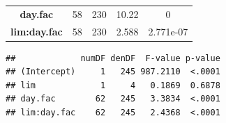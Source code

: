 \documentclass[]{article}
\begin{document}
\begin{longtable}[]{@{}ccccc@{}}
\begin{minipage}[t]{0.21\columnwidth}
\textbf{day.fac}
\strut\end{minipage} &
\begin{minipage}[t]{0.10\columnwidth}\centering\strut
58
\strut\end{minipage} &
\begin{minipage}[t]{0.10\columnwidth}\centering\strut
230
\strut\end{minipage} &
\begin{minipage}[t]{0.12\columnwidth}\centering\strut
10.22
\strut\end{minipage} &
\begin{minipage}[t]{0.12\columnwidth}\centering\strut
0
\strut\end{minipage}\tabularnewline
\begin{minipage}[t]{0.21\columnwidth}\centering\strut
\textbf{lim:day.fac}
\strut\end{minipage} &
\begin{minipage}[t]{0.10\columnwidth}\centering\strut
58
\strut\end{minipage} &
\begin{minipage}[t]{0.10\columnwidth}\centering\strut
230
\strut\end{minipage} &
\begin{minipage}[t]{0.12\columnwidth}\centering\strut
2.588
\strut\end{minipage} &
\begin{minipage}[t]{0.12\columnwidth}\centering\strut
2.771e-07
\strut\end{minipage}\tabularnewline
\bottomrule
\end{longtable}

\begin{verbatim}
##             numDF denDF  F-value p-value
## (Intercept)     1   245 987.2110  <.0001
## lim             1     4   0.1869  0.6878
## day.fac        62   245   3.3834  <.0001
## lim:day.fac    62   245   2.4368  <.0001
\end{verbatim}
\end{document}
